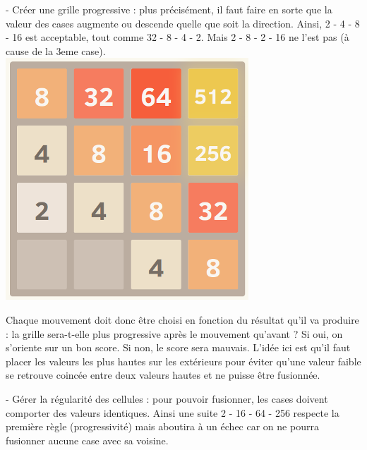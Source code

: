 \documentclass{article}
\begin{document}
  - Créer une grille progressive : plus précisément, il faut faire en sorte que la valeur des cases augmente ou descende quelle que soit la direction. Ainsi, 2 - 4 - 8 - 16 est acceptable, tout comme 32 - 8 - 4 - 2. Mais 2 - 8 - 2 - 16 ne l'est pas (à cause de la 3eme case).
  \\
  \includegraphics[scale=0.5]{../1.png}

Chaque mouvement doit donc être choisi en fonction du résultat qu'il va produire : la grille sera-t-elle plus progressive après le mouvement qu'avant ? Si oui, on s'oriente sur un bon score. Si non, le score sera mauvais. L'idée ici est qu'il faut placer les valeurs les plus hautes sur les extérieurs pour éviter qu'une valeur faible se retrouve coincée entre deux valeurs hautes et ne puisse être fusionnée.

- Gérer la régularité des cellules : pour pouvoir fusionner, les cases doivent comporter des valeurs identiques. Ainsi une suite 2 - 16 - 64 - 256 respecte la première règle (progressivité) mais aboutira à un échec car on ne pourra fusionner aucune case avec sa voisine.
\end{document}
